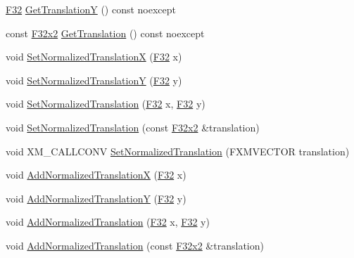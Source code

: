 \begin{DoxyCompactItemize}
\item 
\hyperlink{namespacemage_aa97e833b45f06d60a0a9c4fc22ae02c0}{F32} \hyperlink{classmage_1_1_sprite_transform_a45ac68b47fb751b8c3908524177c37c8}{Get\+TranslationY} () const noexcept
\item 
const \hyperlink{namespacemage_aa87237ad091f5cd7da612b8523fc108f}{F32x2} \hyperlink{classmage_1_1_sprite_transform_a89022e79bd08b6efeb6f660a0da782f0}{Get\+Translation} () const noexcept
\item 
void \hyperlink{classmage_1_1_sprite_transform_ab7b14055dc7dbd47e28881a1c46a7522}{Set\+Normalized\+TranslationX} (\hyperlink{namespacemage_aa97e833b45f06d60a0a9c4fc22ae02c0}{F32} x)
\item 
void \hyperlink{classmage_1_1_sprite_transform_aac384e3769b23e4452e6dd7b416146fa}{Set\+Normalized\+TranslationY} (\hyperlink{namespacemage_aa97e833b45f06d60a0a9c4fc22ae02c0}{F32} y)
\item 
void \hyperlink{classmage_1_1_sprite_transform_a954e7a562a7c68ef402881dc982529ba}{Set\+Normalized\+Translation} (\hyperlink{namespacemage_aa97e833b45f06d60a0a9c4fc22ae02c0}{F32} x, \hyperlink{namespacemage_aa97e833b45f06d60a0a9c4fc22ae02c0}{F32} y)
\item 
void \hyperlink{classmage_1_1_sprite_transform_a816b9f3761710575d6eba87a06d29ec4}{Set\+Normalized\+Translation} (const \hyperlink{namespacemage_aa87237ad091f5cd7da612b8523fc108f}{F32x2} \&translation)
\item 
void X\+M\+\_\+\+C\+A\+L\+L\+C\+O\+NV \hyperlink{classmage_1_1_sprite_transform_af72bc622e7512910e5a9ceb8aeeec22d}{Set\+Normalized\+Translation} (F\+X\+M\+V\+E\+C\+T\+OR translation)
\item 
void \hyperlink{classmage_1_1_sprite_transform_af766622e394f2ace0e2f999d6c642bb5}{Add\+Normalized\+TranslationX} (\hyperlink{namespacemage_aa97e833b45f06d60a0a9c4fc22ae02c0}{F32} x)
\item 
void \hyperlink{classmage_1_1_sprite_transform_aea97be812ff2a83bd255d3419354dbe3}{Add\+Normalized\+TranslationY} (\hyperlink{namespacemage_aa97e833b45f06d60a0a9c4fc22ae02c0}{F32} y)
\item 
void \hyperlink{classmage_1_1_sprite_transform_a4a55fcd4d288b5d7f7703b9a6232b2d1}{Add\+Normalized\+Translation} (\hyperlink{namespacemage_aa97e833b45f06d60a0a9c4fc22ae02c0}{F32} x, \hyperlink{namespacemage_aa97e833b45f06d60a0a9c4fc22ae02c0}{F32} y)
\item 
void \hyperlink{classmage_1_1_sprite_transform_ae8342d6feecca962263d4249ecde4f39}{Add\+Normalized\+Translation} (const \hyperlink{namespacemage_aa87237ad091f5cd7da612b8523fc108f}{F32x2} \&translation)

\end{DoxyCompactItemize}
